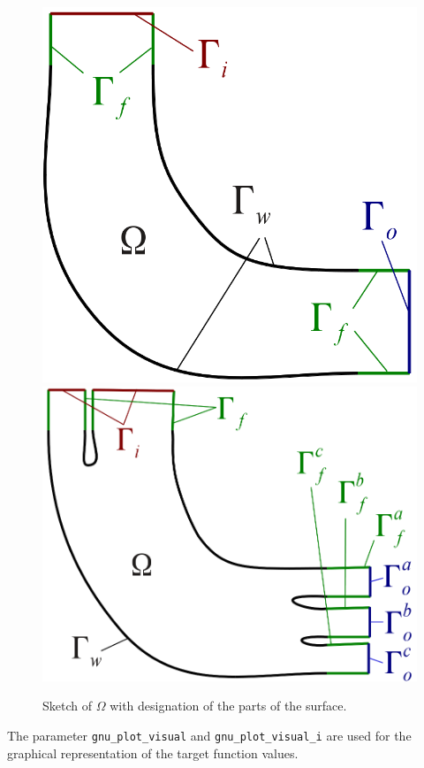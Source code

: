 \documentclass[a4paper,oneside]{book}
\numberwithin{equation}{section}
\begin{document}
\begin{figure}[htbp]
    \centering
    \includegraphics[scale=0.7]{geometrie_skizze_noInterface.png}
    \includegraphics[scale=0.7]{geometrie_skizze_MultOutlet.png}
    \caption{Sketch of $\Omega$ with designation of the parts of the surface.}
    \label{Sketch_extrusion}
\end{figure}

The parameter \verb|gnu_plot_visual| and \verb|gnu_plot_visual_i| are used for the graphical representation of the target function values.
\end{document}
